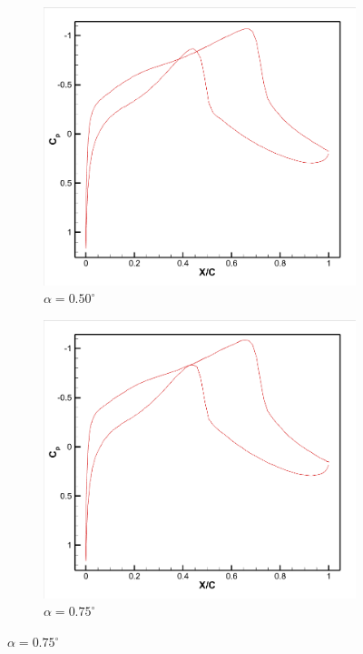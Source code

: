 \begin{figure}[H]
\hfill
\begin{subfigure}[b]{0.18\textwidth}
\centering
\includegraphics[width=\linewidth]{8.png}
\caption{$\alpha=0.50^\circ$}
\end{subfigure}
\hfill
\begin{subfigure}[b]{0.18\textwidth}
\centering
\includegraphics[width=\linewidth]{9.png}
\caption{$\alpha=0.75^\circ$}
\end{subfigure}

\end{figure}
